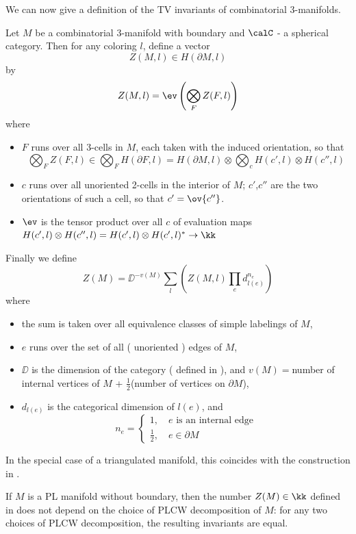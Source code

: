We can now give a definition of the TV invariants of combinatorial 3-manifolds.

\begin{definition}\label{d:TV_invariant}
	Let $M$ be a combinatorial 3-manifold with boundary and $\calC$ - a spherical category. Then for any coloring $l$, 
	define a vector
	\[
		Z(M,l) \in H( \partial M,l)
	\]
	by
	\[
	Z(M,l) = \ev\left( \bigotimes_F Z(F,l) \right)
	\]
	where
	\begin{itemize}
		\item $F$ runs over all 3-cells in $M$, each taken with the induced orientation, so that 
		\[
		\bigotimes_F Z(F,l) \in \bigotimes_F H(\partial F,l) = H(\partial M,l) \otimes \bigotimes_c H(c',l) \otimes H(c'',l)
		\]
		\item $c$ runs over all unoriented 2-cells in the interior of $M$; $c'$,$c''$ are the two orientations of such a cell, so 
		that $c'=\ov{c''}$.
		\item $\ev$ is the tensor product over all $c$ of evaluation maps 
		$H(c',l)\otimes H(c'',l)=H(c',l)\otimes H(c',l)^* \rightarrow \kk$
	\end{itemize}
	Finally we define
	\[
	Z(M)= \DD^{-v (M)} \sum_{l} \left(  Z( M,l) \prod_{e} d^{n_e}_{l(e)} \right)
	\]
	where
	\begin{itemize}
		\item the sum is taken over all equivalence classes of simple labelings of $M$,
		\item $e$ runs over the set of all ( unoriented ) edges of $M$,
		\item $\DD$ is the dimension of the category ( defined in ), and $v(M)=$number 
		of internal vertices of $M$ + $\frac{1}{2}$(number of vertices on $\partial M$),
		\item $d_{l(e)} $ is the categorical dimension of $l(e)$, and
		$$ n_e = \begin{cases}
			1,\quad e \text{ is an internal edge}\\
			\tfrac{1}{2},\quad e\in \partial M
		\end{cases}
		$$
	\end{itemize}
\end{definition}

In the special case of a triangulated manifold, this coincides with the construction in \cite{barrett}.

\begin{theorem}\label{t:main1}
	If $M$ is a PL manifold without boundary, then the number $Z(M) \in \kk$ defined in  
	does not depend on the choice of PLCW decomposition of $M$: for any two choices of PLCW decomposition, 
	the resulting invariants are equal.
\end{theorem}


